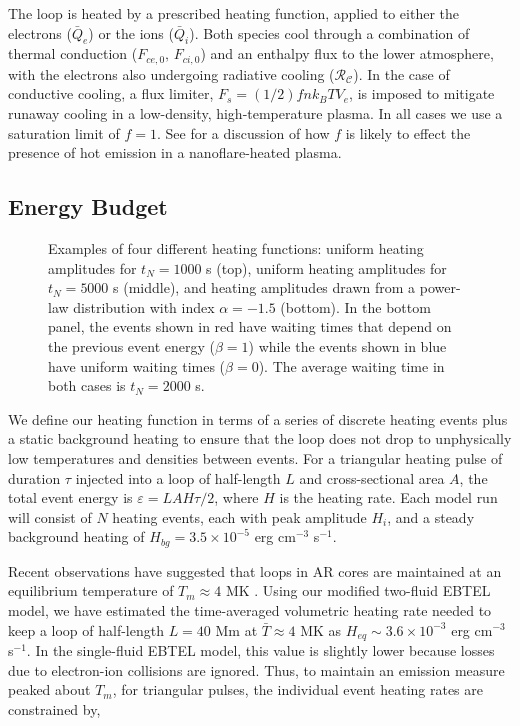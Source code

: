 \documentclass[preprint,linenumbers]{aastex}
\begin{document}
	\par The loop is heated by a prescribed heating function, applied to either the electrons ($\bar{Q}_e$) or the ions ($\bar{Q}_i$). Both species cool through a combination of thermal conduction ($F_{ce,0},\,F_{ci,0}$) and an enthalpy flux to the lower atmosphere, with the electrons also undergoing radiative cooling ($\mathcal{R_C}$). In the case of conductive cooling, a flux limiter, $F_s=(1/2)fnk_BTV_e$, is imposed to mitigate runaway cooling in a low-density, high-temperature plasma. In all cases we use a saturation limit of $f=1$. See  for a discussion of how $f$ is likely to effect the presence of hot emission in a nanoflare-heated plasma.
	\subsection{Energy Budget}
	\label{subsec:params}
	\begin{figure}
		\caption{Examples of four different heating functions: uniform heating amplitudes for $t_N=1000$ s (top), uniform heating amplitudes for $t_N=5000$ s (middle), and heating amplitudes drawn from a power-law distribution with index $\alpha=-1.5$ (bottom). In the bottom panel, the events shown in red have waiting times that depend on the previous event energy ($\beta=1$) while the events shown in blue have uniform waiting times ($\beta=0$). The average waiting time in both cases is $t_N=2000$ s.}
		\label{fig:heating_funcs}
	\end{figure}
	\par We define our heating function in terms of a series of discrete heating events plus a static background heating to ensure that the loop does not drop to unphysically low temperatures and densities between events. For a triangular heating pulse of duration $\tau$ injected into a loop of half-length $L$ and cross-sectional area $A$, the total  event energy is $\varepsilon=LAH\tau/2$, where $H$ is the heating rate. Each model run will consist of $N$ heating events, each with peak amplitude $H_i$, and a steady background heating of $H_{bg}=3.5\times10^{-5}$ erg cm$^{-3}$ s$^{-1}$.
	\par Recent observations have suggested that loops in AR cores are maintained at an equilibrium temperature of $T_{m}\approx4$ MK \citep{warren_constraints_2011,warren_systematic_2012}. Using our modified two-fluid EBTEL model, we have estimated the time-averaged volumetric heating rate needed to keep a loop of half-length $L=40$ Mm at $\bar{T}\approx4$ MK as  $H_{eq}\sim3.6\times10^{-3}$ erg cm$^{-3}$ s$^{-1}$. In the single-fluid EBTEL model, this value is slightly lower because losses due to electron-ion collisions are ignored. Thus, to maintain an emission measure peaked about $T_{m}$, for triangular pulses, the individual event heating rates are constrained by,
\end{document}
